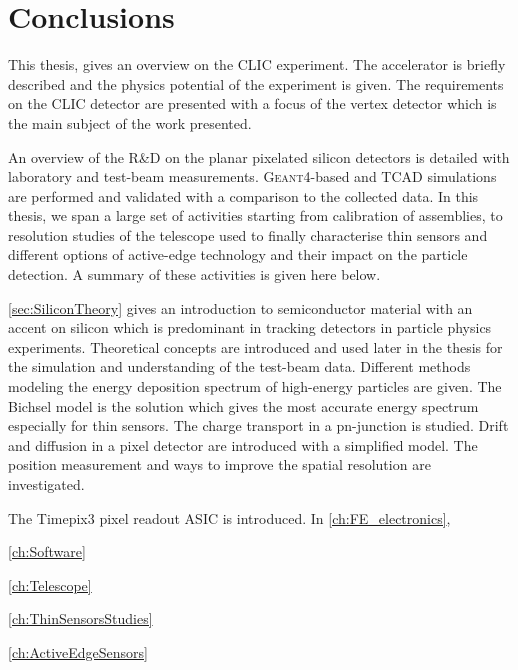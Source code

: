 \chapter{Conclusions}
\label{ch:conclusions}

This thesis, gives an overview on the CLIC experiment. The accelerator
is briefly described and the physics potential of the experiment is
given. The requirements on the CLIC detector are presented with a
focus of the vertex detector which is the main subject of the work
presented.

An overview of the R\&D on the planar pixelated silicon detectors is
detailed with laboratory and test-beam
measurements. \textsc{Geant4}-based and TCAD simulations are performed
and validated with a comparison to the collected data. In this thesis,
we span a large set of activities starting from calibration of
assemblies, to resolution studies of the telescope used to finally
characterise thin sensors and different options of active-edge
technology and their impact on the particle detection. A summary of
these activities is given here below.

\cref{sec:SiliconTheory} gives an introduction to semiconductor
material with an accent on silicon which is predominant in tracking
detectors in particle physics experiments. Theoretical concepts are
introduced and used later in the thesis for the simulation and
understanding of the test-beam data. Different methods modeling the
energy deposition spectrum of high-energy particles are given. The
Bichsel model is the solution which gives the most accurate energy
spectrum especially for thin sensors. The charge transport in a
pn-junction is studied. Drift and diffusion in a pixel detector are
introduced with a simplified model. The position measurement and ways
to improve the spatial resolution are investigated.

The Timepix3 pixel readout ASIC is introduced. In
\cref{ch:FE_electronics},

\cref{ch:Software}

\cref{ch:Telescope}

\cref{ch:ThinSensorsStudies}

\cref{ch:ActiveEdgeSensors}

